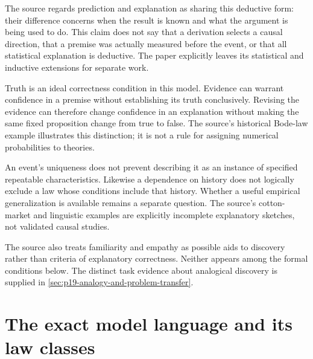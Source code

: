 The source regards prediction and explanation as sharing this
deductive form: their difference concerns when the result
is known and what the argument is being used to do.
This claim does not say that a derivation selects a causal
direction, that a premise was actually measured before
the event, or that all statistical explanation is deductive.
The paper explicitly leaves its statistical and inductive
extensions for separate work.

Truth is an ideal correctness condition in this model.
Evidence can warrant confidence in a premise without
establishing its truth conclusively. Revising the evidence
can therefore change confidence in an explanation without
making the same fixed proposition change from true to false.
The source's historical Bode-law example illustrates this
distinction; it is not a rule for assigning numerical
probabilities to theories.

An event's uniqueness does not prevent describing it
as an instance of specified repeatable characteristics.
Likewise a dependence on history does not logically
exclude a law whose conditions include that history.
Whether a useful empirical generalization is available
remains a separate question. The source's cotton-market
and linguistic examples are explicitly incomplete
explanatory sketches, not validated causal studies.

The source also treats familiarity and empathy as
possible aids to discovery rather than criteria of
explanatory correctness. Neither appears among the
formal conditions below. The distinct task evidence
about analogical discovery is supplied in
\cref{sec:p19-analogy-and-problem-transfer}.

\section{The exact model language and its law classes}
\label{sec:p16-dn-language}

